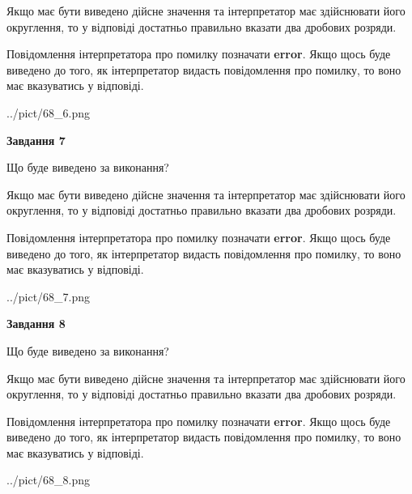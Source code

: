 \documentclass[12pt, ukrainian]{article}
\begin{document}
{\begin {Large}
Якщо має бути виведено дійсне значення та інтерпретатор має здійснювати його округлення, 
то у відповіді достатньо правильно вказати два дробових розряди.

Повідомлення інтерпретатора про помилку позначати \textbf{error}.
Якщо щось буде виведено до того, як інтерпретатор видасть повідомлення про помилку, 
то воно має вказуватись у відповіді. \par

\begin{center}
	{../pict/68_6.png}
\end{center}
\newpage

{\begin {center}\textbf{Завдання 7}\end {center}}\par
Що буде виведено за виконання? \par

Якщо має бути виведено дійсне значення та інтерпретатор має здійснювати його округлення, 
то у відповіді достатньо правильно вказати два дробових розряди.

Повідомлення інтерпретатора про помилку позначати \textbf{error}.
Якщо щось буде виведено до того, як інтерпретатор видасть повідомлення про помилку, 
то воно має вказуватись у відповіді. \par

\begin{center}
	{../pict/68_7.png}
\end{center}
\newpage

{\begin {center}\textbf{Завдання 8}\end {center}}\par
Що буде виведено за виконання? \par

Якщо має бути виведено дійсне значення та інтерпретатор має здійснювати його округлення, 
то у відповіді достатньо правильно вказати два дробових розряди.

Повідомлення інтерпретатора про помилку позначати \textbf{error}.
Якщо щось буде виведено до того, як інтерпретатор видасть повідомлення про помилку, 
то воно має вказуватись у відповіді. \par

\begin{center}
	{../pict/68_8.png}
\end{center}
\newpage


\end{Large}}
\end{document}
